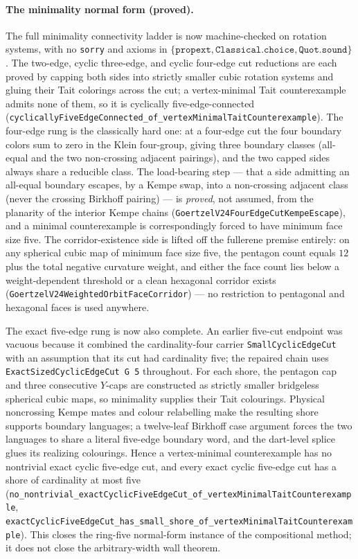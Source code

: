 \documentclass[11pt]{article}
\theoremstyle{definition}
\begin{document}
\paragraph{The minimality normal form (proved).} The full minimality
connectivity ladder is now machine-checked on rotation systems, with no
\texttt{sorry} and axioms in
$\{\texttt{propext},\texttt{Classical.choice},\texttt{Quot.sound}\}$. The
two-edge, cyclic three-edge, and cyclic four-edge cut reductions are each
proved by capping both sides into strictly smaller cubic rotation systems and
gluing their Tait colorings across the cut; a vertex-minimal Tait
counterexample admits none of them, so it is cyclically five-edge-connected
(\texttt{cyclicallyFiveEdgeConnected\_of\_vertexMinimalTaitCounterexample}).
The four-edge rung is the classically hard one: at a four-edge cut the four
boundary colors sum to zero in the Klein four-group, giving three boundary
classes (all-equal and the two non-crossing adjacent pairings), and the two
capped sides always share a reducible class. The load-bearing step --- that a
side admitting an all-equal boundary escapes, by a Kempe swap, into a
non-crossing adjacent class (never the crossing Birkhoff pairing) --- is
\emph{proved}, not assumed, from the planarity of the interior Kempe chains
(\texttt{GoertzelV24FourEdgeCutKempeEscape}), and a minimal counterexample is
correspondingly forced to have minimum face size five. The corridor-existence
side is lifted off the fullerene premise entirely: on any spherical cubic map
of minimum face size five, the pentagon count equals $12$ plus the total
negative curvature weight, and either the face count lies below a
weight-dependent threshold or a clean hexagonal corridor exists
(\texttt{GoertzelV24WeightedOrbitFaceCorridor}) --- no restriction to
pentagonal and hexagonal faces is used anywhere.

The exact five-edge rung is now also complete.  An earlier five-cut endpoint
was vacuous because it combined the cardinality-four carrier
\texttt{SmallCyclicEdgeCut} with an assumption that its cut had cardinality
five; the repaired chain uses \texttt{ExactSizedCyclicEdgeCut G 5} throughout.
For each shore, the pentagon cap and three consecutive $Y$-caps are constructed
as strictly smaller bridgeless spherical cubic maps, so minimality supplies
their Tait colourings.  Physical noncrossing Kempe mates and colour relabelling
make the resulting shore supports boundary languages; a twelve-leaf Birkhoff
case argument forces the two languages to share a literal five-edge boundary
word, and the dart-level splice glues its realizing colourings.  Hence a
vertex-minimal counterexample has no nontrivial exact cyclic five-edge cut, and
every exact cyclic five-edge cut has a shore of cardinality at most five
(\texttt{no\_nontrivial\_exactCyclicFiveEdgeCut\_of\_vertexMinimalTaitCounterexample},
\texttt{exactCyclicFiveEdgeCut\_has\_small\_shore\_of\_vertexMinimalTaitCounterexample}).
This closes the ring-five normal-form instance of the compositional method; it
does not close the arbitrary-width wall theorem.
\end{document}
